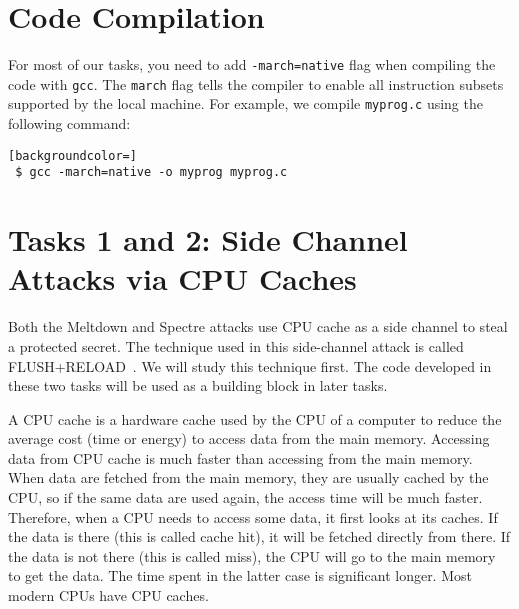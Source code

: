
\section{Code Compilation}
\label{sidechannel:sec:compilation}


For most of our tasks, you need to add \texttt{-march=native}
flag when compiling the code with
\texttt{gcc}. The \texttt{march} flag tells the compiler to enable all
instruction subsets supported by the local machine.
For example, we compile \texttt{myprog.c} using the following command:

\begin{lstlisting}[backgroundcolor=]
 $ gcc -march=native -o myprog myprog.c
 \end{lstlisting}





\section{Tasks 1 and 2: Side Channel Attacks via CPU Caches}

Both the Meltdown and Spectre attacks use CPU cache as a side channel to steal
a protected secret. The technique used in this side-channel attack is called 
FLUSH+RELOAD~\cite{Yarom2014}. 
We will study this technique first. The code developed in these two tasks will be 
used as a building block in later tasks. 


A CPU cache is a hardware cache used by the CPU of a computer 
to reduce the average cost (time or energy) to access
data from the main memory. Accessing data from CPU cache is much faster
than accessing from the main memory. When data are fetched from the main memory, they
are usually cached by the CPU, so if the same data are used again, the access
time will be much faster. Therefore, when a CPU needs to access some data, it
first looks at its caches. If the data is there (this is called cache hit), 
it will be fetched directly from there. If the data is not there (this is
called miss), the CPU will go to the main memory to get the data. The time 
spent in the latter case is significant longer. Most modern CPUs have
CPU caches. 



